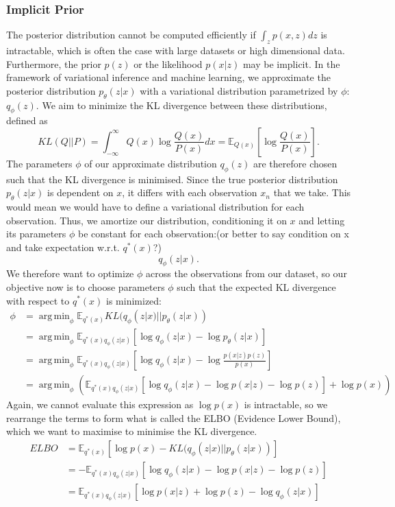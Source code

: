 \documentclass[a4paper,12pt]{article}
\DeclareMathOperator*{\argmin}{arg\,min}
\numberwithin{equation}{section}
\begin{document}
\subsubsection{Implicit Prior}
The posterior distribution cannot be computed efficiently if $\int_z p(x,z)dz$ is intractable, which is often the case with large datasets or high dimensional data. Furthermore, the prior $p(z)$ or the likelihood $p(x|z)$ may be implicit. In the framework of variational inference and machine learning, we approximate the posterior distribution $p_\theta (z|x)$ with a variational distribution parametrized by $\phi$: $q_\phi (z)$. We aim to minimize the KL divergence between these distributions, defined as 
\[KL(Q||P)=\int_{-\infty}^\infty Q(x)\log \frac{Q(x)}{P(x)}dx=\mathbb{E}_{Q(x)}\left[\log\frac{Q(x)}{P(x)}\right].\]
The parameters $\phi$ of our approximate distribution $q_\phi (z)$ are therefore chosen such that the KL divergence is minimised. Since the true posterior distribution $p_\theta(z|x)$ is dependent on $x$, it differs with each observation $x_n$ that we take. This would mean we would have to define a variational distribution for each observation. Thus, we amortize our distribution, conditioning it on $x$ and letting its parameters $\phi$ be constant for each observation:(or better to say condition on x and take expectation w.r.t. $q^*(x)$?)
\[q_\phi(z|x).\]
We therefore want to optimize $\phi$ across the observations from our dataset, so our objective now is to choose parameters $\phi$ such that the expected KL divergence with respect to $q^*(x)$ is minimized:
\begin{align*}
\phi &=\argmin_\phi \mathbb{E}_{q^*(x)}KL(q_\phi(z|x)||p_\theta (z|x))\\
&= \argmin_\phi \mathbb{E}_{q^*(x)q_\phi (z|x)}\left[\log q_\phi(z|x)-\log p_\theta(z|x)\right]\\
&=\argmin_\phi\mathbb{E}_{q^*(x)q_\phi (z|x)}\left[\log q_\phi(z|x)-\log \frac{p(x|z)p(z)}{p(x)}\right]\\
&=\argmin_\phi\left(\mathbb{E}_{q^*(x)q_\phi (z|x)}\left[\log q_\phi(z|x)-\log p(x|z)-\log p(z)\right]+\log p(x)\right)
\end{align*}
Again, we cannot evaluate this expression as $\log p(x)$ is intractable, so we rearrange the terms to form what is called the ELBO (Evidence Lower Bound), which we want to maximise to minimise the KL divergence.
\begin{align*}
ELBO&=\mathbb{E}_{q^*(x)}[\log p(x)-KL(q_\phi(z|x)||p_\theta(z|x))]\\
&=-\mathbb{E}_{q^*(x)q_\phi(z|x)}\left[\log q_\phi(z|x)-\log p(x|z)-\log p(z)\right]\\
&=\mathbb{E}_{q^*(x)q_\phi(z|x)}\left[\log p(x|z)+\log p(z)-\log q_\phi(z|x)\right]
\end{align*}
\end{document}
